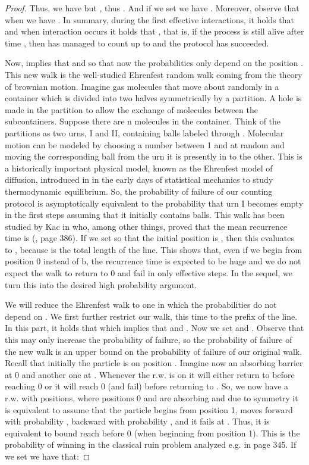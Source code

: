 \documentclass[oribibl, 11pt]{llncs}
\begin{document}
\begin{proof}
Thus, we have  but , thus    . And if we set  we have . Moreover, observe that when  we have  . In summary, during the first  effective interactions, it holds that  and when interaction  occurs it holds that , that is, if the process is still alive after time , then  has managed to count up to  and the protocol has succeeded.

Now,  implies that   and  so that now the probabilities only depend on the position . This new walk is the well-studied Ehrenfest random walk coming from the theory of brownian motion. Imagine gas molecules that move about randomly in a container which is divided into two halves symmetrically by a partition. A hole is made in the partition to allow the exchange of molecules between the subcontainers. Suppose there are n molecules in the container. Think of the partitions as two urns, I and II, containing balls labeled  through . Molecular motion can be modeled by choosing a number between 1 and  at random and moving the corresponding ball from the urn it is presently in to the other. This is a historically important physical model, known as the Ehrenfest model of diffusion, introduced in \cite{EE07} in the early days of statistical mechanics to study thermodynamic equilibrium. So, the probability of failure of our counting protocol is asymptotically equivalent to the probability that urn I becomes empty in the first  steps assuming that it initially contains  balls. This walk has been studied by Kac in \cite{Ka47} who, among other things, proved that the mean recurrence time is  (\cite{Ka47}, page 386). If we set  so that the initial position is , then this evaluates to , because  is the total length of the line. This shows that, even if we begin from position 0 instead of b, the recurrence time is expected to be huge and we do not expect the walk to return to 0 and fail in only  effective steps. In the sequel, we turn this into the desired high probability argument.

We will reduce the Ehrenfest walk to one in which the probabilities do not depend on . We first further restrict our walk, this time to the prefix  of the line. In this part, it holds that  which implies that   and . Now we set   and . Observe that this may only increase the probability of failure, so the probability of failure of the new walk is an upper bound on the probability of failure of our original walk. Recall that initially the particle is on position . Imagine now an absorbing barrier at 0 and another one at . Whenever the r.w. is on  it will either return to  before reaching 0 or it will reach 0 (and fail) before returning to . So, we now have a r.w. with  positions, where positions 0 and  are absorbing and due to symmetry it is equivalent to assume that the particle begins from position 1, moves forward with probability , backward with probability , and it fails at . Thus, it is equivalent to bound reach  before 0 (when beginning from position 1). This is the probability of winning in the classical ruin problem analyzed e.g. in \cite{Fe68} page 345. If we set  we have that:



\end{proof}
\end{document}
